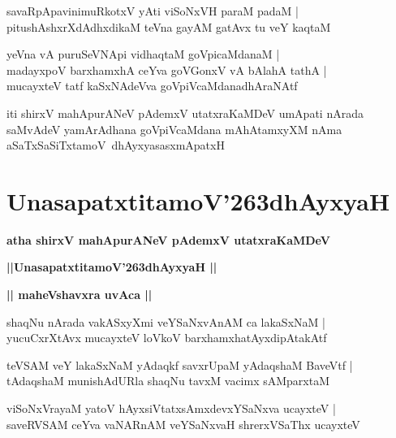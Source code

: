 \documentclass[twoside,12pt,openright]{book}
\def\S{\char'263}
\newcounter{shloka}[chapter]
\def\uvaca#1{\centerline{{\large\textbf{#1}}}}
\begin{document}
\begin{shloka}%
savaRpApavinimuRkotxV yAti viSoNxVH paraM padaM |\\
pitushAshxrXdAdhxdikaM teVna gayAM gatAvx tu veY kaqtaM 
\end{shloka}

\begin{shloka}%
yeVna vA puruSeVNApi vidhaqtaM goVpicaMdanaM |\\
madayxpoV barxhamxhA ceYva goVGonxV vA bAlahA tathA |\\
mucayxteV tatf kaSxNAdeVva goVpiVcaMdanadhAraNAtf
\end{shloka}

\begin{center}
iti shirxV mahApurANeV pAdemxV utatxraKaMDeV umApati nArada saMvAdeV yamArAdhana goVpiVcaMdana 
mAhAtamxyXM nAma aSaTxSaSiTxtamoV\ dhAyxyasasxmApatxH
\end{center}

\chapter{UnasapatxtitamoV\S dhAyxyaH}

\begin{center}
{\LARGE\bfseries atha shirxV mahApurANeV pAdemxV utatxraKaMDeV}
\end{center}

\begin{center}
{\LARGE\bfseries ||UnasapatxtitamoV\S dhAyxyaH || }
\end{center}

\uvaca{|| maheVshavxra uvAca ||}

\begin{shloka}%
shaqNu nArada vakASxyXmi veYSaNxvAnAM ca lakaSxNaM |\\
yucuCxrXtAvx mucayxteV loVkoV barxhamxhatAyxdipAtakAtf 
\end{shloka}

\begin{shloka}%
teVSAM veY lakaSxNaM yAdaqkf savxrUpaM yAdaqshaM BaveVtf |\\
tAdaqshaM munishAdURla shaqNu tavxM vacimx sAMparxtaM 
\end{shloka}

\begin{shloka}%
viSoNxVrayaM yatoV hAyxsiVtatxsAmxdevxYSaNxva ucayxteV |\\
saveRVSAM ceYva vaNARnAM veYSaNxvaH shrerxVSaThx ucayxteV 
\end{shloka}
\end{document}

